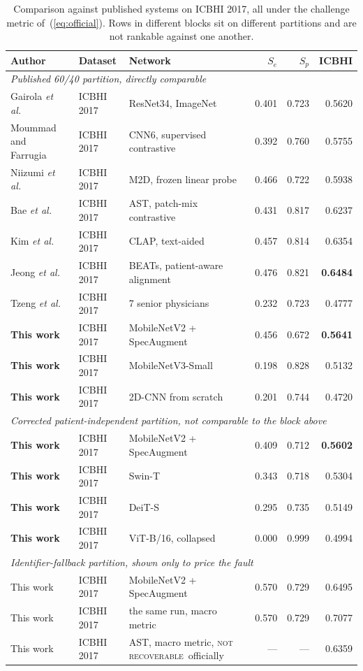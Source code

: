 \documentclass[journal,onecolumn]{IEEEtran}
\newcommand{\best}[1]{\textbf{#1}}
\newcommand{\notrec}{\textsc{not recoverable}}
\begin{document}
\begin{table}[!t]
\centering
\caption{Comparison against published systems on ICBHI 2017, all under the challenge metric
of~(\ref{eq:official}). Rows in different blocks sit on different partitions and are not
rankable against one another.}
\label{tab:comparison}
\footnotesize
\begin{tabular}{lllrrr}
\toprule
Author & Dataset & Network & $S_e$ & $S_p$ & \best{ICBHI} \\
\midrule
\multicolumn{6}{l}{\emph{Published 60/40 partition, directly comparable}}\\
Gairola \emph{et al.}~\cite{respirenet2021} & ICBHI 2017 & ResNet34, ImageNet & 0.401 & 0.723 & 0.5620 \\
Moummad and Farrugia~\cite{scl2023} & ICBHI 2017 & CNN6, supervised contrastive & 0.392 & 0.760 & 0.5755 \\
Niizumi \emph{et al.}~\cite{frozenfm2025} & ICBHI 2017 & M2D, frozen linear probe & 0.466 & 0.722 & 0.5938 \\
Bae \emph{et al.}~\cite{bae2023patchmix} & ICBHI 2017 & AST, patch-mix contrastive & 0.431 & 0.817 & 0.6237 \\
Kim \emph{et al.}~\cite{bts2024} & ICBHI 2017 & CLAP, text-aided & 0.457 & 0.814 & 0.6354 \\
Jeong \emph{et al.}~\cite{pafa2025} & ICBHI 2017 & BEATs, patient-aware alignment & 0.476 & 0.821 & \best{0.6484} \\
Tzeng \emph{et al.}~\cite{tzeng2025jmir} & ICBHI 2017 & 7 senior physicians & 0.232 & 0.723 & 0.4777 \\
\addlinespace
\best{This work} & ICBHI 2017 & MobileNetV2 + SpecAugment & 0.456 & 0.672 & \best{0.5641} \\
\best{This work} & ICBHI 2017 & MobileNetV3-Small & 0.198 & 0.828 & 0.5132 \\
\best{This work} & ICBHI 2017 & 2D-CNN from scratch & 0.201 & 0.744 & 0.4720 \\
\midrule
\multicolumn{6}{l}{\emph{Corrected patient-independent partition, not comparable to the block above}}\\
\best{This work} & ICBHI 2017 & MobileNetV2 + SpecAugment & 0.409 & 0.712 & \best{0.5602} \\
\best{This work} & ICBHI 2017 & Swin-T & 0.343 & 0.718 & 0.5304 \\
\best{This work} & ICBHI 2017 & DeiT-S & 0.295 & 0.735 & 0.5149 \\
\best{This work} & ICBHI 2017 & ViT-B/16, collapsed & 0.000 & 0.999 & 0.4994 \\
\midrule
\multicolumn{6}{l}{\emph{Identifier-fallback partition, shown only to price the fault}}\\
This work & ICBHI 2017 & MobileNetV2 + SpecAugment & 0.570 & 0.729 & 0.6495 \\
This work & ICBHI 2017 & the same run, macro metric & 0.570 & 0.729 & 0.7077 \\
This work & ICBHI 2017 & AST, macro metric, \notrec\ officially & --- & --- & 0.6359 \\
\bottomrule
\end{tabular}


\end{table}
\end{document}
